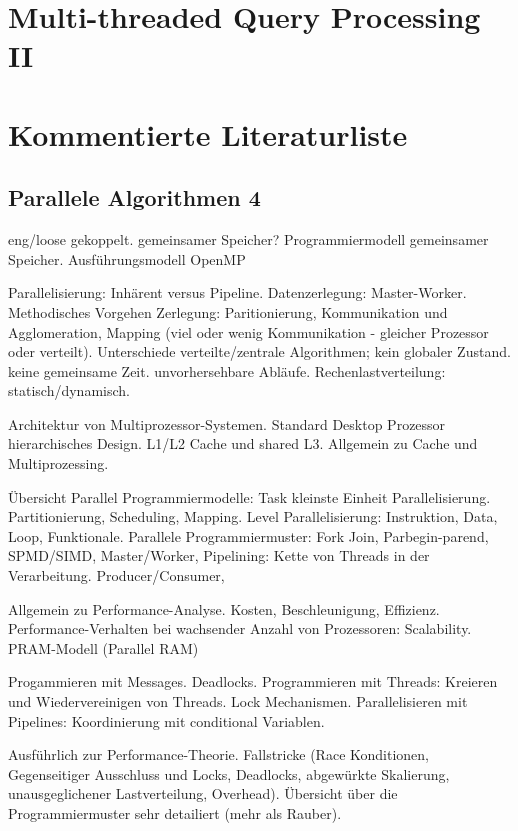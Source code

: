 \documentclass[a4paper,12pt,twoside]{article}
\begin{document}
\section*{Multi-threaded Query Processing II}

\section{Kommentierte Literaturliste}

\subsection{Parallele Algorithmen 4}



\textbf{}

eng/loose gekoppelt. gemeinsamer Speicher? Programmiermodell gemeinsamer Speicher. Ausführungsmodell OpenMP

Parallelisierung: Inhärent versus Pipeline. Datenzerlegung: Master-Worker. Methodisches Vorgehen Zerlegung: Paritionierung, Kommunikation und Agglomeration, Mapping (viel oder wenig Kommunikation - gleicher Prozessor oder verteilt). Unterschiede verteilte/zentrale Algorithmen; kein globaler Zustand. keine gemeinsame Zeit. unvorhersehbare Abläufe. Rechenlastverteilung: statisch/dynamisch. 


\textbf{}

Architektur von Multiprozessor-Systemen. Standard Desktop Prozessor hierarchisches Design. L1/L2 Cache und shared L3. Allgemein zu Cache und Multiprozessing. 

Übersicht Parallel Programmiermodelle: Task kleinste Einheit Parallelisierung.  Partitionierung, Scheduling, Mapping. Level Parallelisierung: Instruktion, Data, Loop, Funktionale. Parallele Programmiermuster: Fork Join, Parbegin-parend, SPMD/SIMD, Master/Worker, Pipelining: Kette von Threads in der Verarbeitung. Producer/Consumer,

Allgemein zu Performance-Analyse. Kosten, Beschleunigung, Effizienz. Performance-Verhalten bei wachsender Anzahl von Prozessoren: Scalability. PRAM-Modell (Parallel RAM)

Progammieren mit Messages. Deadlocks. Programmieren mit Threads: Kreieren und Wiedervereinigen von Threads. Lock Mechanismen. Parallelisieren mit Pipelines: Koordinierung mit conditional Variablen. 

\textbf{}

Ausführlich zur Performance-Theorie. Fallstricke (Race Konditionen, Gegenseitiger Ausschluss und Locks, Deadlocks, abgewürkte Skalierung, unausgeglichener Lastverteilung, Overhead). Übersicht über die Programmiermuster sehr detailiert (mehr als Rauber).
\end{document}
